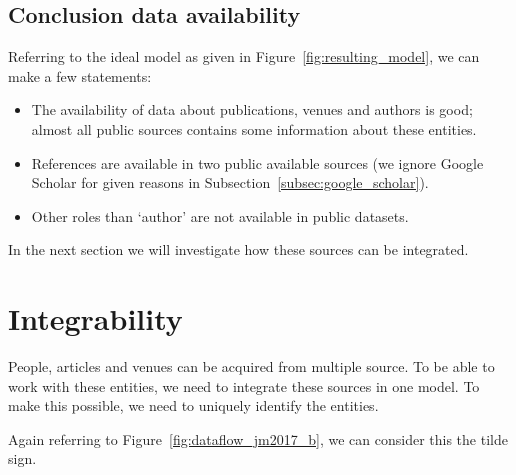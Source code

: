 \documentclass{ou-report}
\begin{document}
\subsection{Conclusion data availability}
\label{subsec:ConclusionsDataAvailablity}
Referring to the ideal model as given in Figure~\ref{fig:resulting_model}, we 
can make a few statements:
\begin{itemize}
    \item The availability of data about publications, venues and authors is 
    good; almost all public sources contains some information about these 
    entities. 
    \item References are available in two public available sources (we ignore 
    Google Scholar for given reasons in Subsection~\ref{subsec:google_scholar}).
    \item Other roles than `author' are not available in public datasets.
\end{itemize}

In the next section we will investigate how these sources can be integrated.



\section{Integrability}
\label{sec:data_integrability}
People, articles and venues can be acquired from multiple source. To be able to 
work with these entities, we need to integrate these sources in one model. To 
make this possible, we need to uniquely identify the entities.

Again referring to Figure~\ref{fig:dataflow_jm2017_b}, we can consider this the 
tilde sign.
\end{document}

